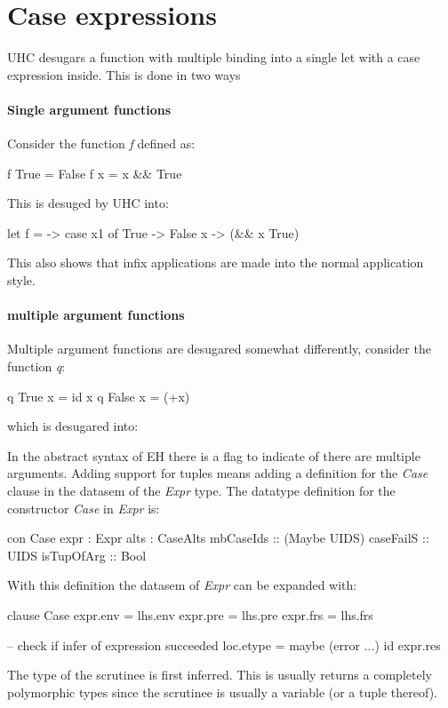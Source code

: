 \section{Case expressions}
UHC desugars a function with multiple binding into a single let with a case expression inside. This is done in two ways
\paragraph{Single argument functions}
Consider the function \emph{f} defined as:
\begin{code}
f True  = False
f x     = x && True
\end{code}
This is desuged by UHC into:
\begin{code}
let f =  -> case x1 of
                 True -> False
                 x -> (&& x True)
\end{code}
This also shows that infix applications are made into the normal application style.

\paragraph{multiple argument functions}
Multiple argument functions are desugared somewhat differently, consider the function \emph{q}:
\begin{code}
q True  x = id x
q False x = (+x)
\end{code}
which is desugared into:

In the abstract syntax of EH there is a flag to indicate of there are multiple arguments. Adding support for tuples means adding a definition for the \emph{Case} clause in the datasem of the \emph{Expr} type. The datatype definition for the constructor \emph{Case} in \emph{Expr} is:
\begin{code}
  con Case
    expr          :  Expr
    alts          :  CaseAlts
    mbCaseIds     :: (Maybe UIDS)
    caseFailS     :: UIDS
    isTupOfArg    :: Bool
\end{code}

With this definition the datasem of \emph{Expr} can be expanded with:

\begin{code}
   clause Case
      expr.env  = lhs.env
      expr.pre  = lhs.pre
      expr.frs  = lhs.frs
      
      -- check if infer of expression succeeded
      loc.etype = maybe (error ...) id expr.res
\end{code}
The type of the scrutinee is first inferred. This is usually returns a completely polymorphic types since the scrutinee is usually a variable (or a tuple thereof). 

